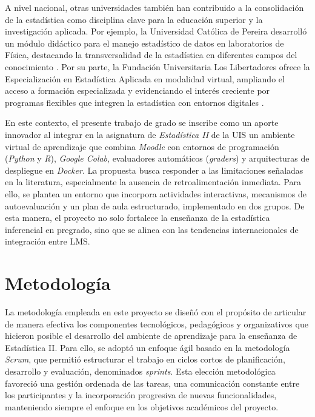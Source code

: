 \documentclass[letter,oneside,12pt,spanish]{report}
\begin{document}
A nivel nacional, otras universidades también han contribuido a la consolidación de la estadística
 como disciplina clave para la educación superior y la investigación aplicada. Por ejemplo, la 
 Universidad Católica de Pereira desarrolló un módulo didáctico para el manejo estadístico de 
 datos en laboratorios de Física, destacando la transversalidad de la estadística en diferentes 
 campos del conocimiento \parencite{ucp2018}. Por su parte, la Fundación Universitaria Los 
 Libertadores ofrece la Especialización en Estadística Aplicada en modalidad virtual, ampliando 
 el acceso a formación especializada y evidenciando el interés creciente por programas flexibles 
 que integren la estadística con entornos digitales \parencite{libertadoressf}.

En este contexto, el presente trabajo de grado se inscribe como un aporte innovador al 
integrar en la asignatura de \textit{Estadística II} de la UIS un ambiente virtual de aprendizaje 
que combina \textit{Moodle} con entornos de programación (\textit{Python} y \textit{R}), 
\textit{Google Colab}, evaluadores automáticos (\textit{graders}) y arquitecturas de despliegue en 
\textit{Docker}. La propuesta busca responder a las limitaciones señaladas en la literatura, 
especialmente la ausencia de retroalimentación inmediata. Para ello, se plantea un entorno que 
incorpora actividades interactivas, mecanismos de autoevaluación y un plan de aula estructurado, 
implementado en dos grupos. De esta manera, el proyecto no solo fortalece la enseñanza de la 
estadística inferencial en pregrado, sino que se alinea con las tendencias internacionales de 
integración entre LMS.

\newpage

\chapter{Metodología}

La metodología empleada en este proyecto se diseñó con el propósito de articular de manera efectiva los componentes tecnológicos, pedagógicos y organizativos que hicieron posible el desarrollo del ambiente de aprendizaje para la enseñanza de Estadística II. Para ello, se adoptó un enfoque ágil basado en la metodología \textit{Scrum}, que permitió estructurar el trabajo en ciclos cortos de planificación, desarrollo y evaluación, denominados \textit{sprints}. Esta elección metodológica favoreció una gestión ordenada de las tareas, una comunicación constante entre los participantes y la incorporación progresiva de nuevas funcionalidades, manteniendo siempre el enfoque en los objetivos académicos del proyecto.
\end{document}
